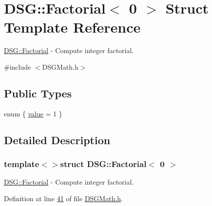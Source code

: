 \hypertarget{struct_d_s_g_1_1_factorial_3_010_01_4}{\section{D\+S\+G\+:\+:Factorial$<$ 0 $>$ Struct Template Reference}
\label{struct_d_s_g_1_1_factorial_3_010_01_4}
}


\hyperlink{struct_d_s_g_1_1_factorial}{D\+S\+G\+::\+Factorial} -\/ Compute integer factorial.  




{\ttfamily \#include $<$D\+S\+G\+Math.\+h$>$}

\subsection*{Public Types}
\begin{DoxyCompactItemize}
\item 
enum \{ \hyperlink{struct_d_s_g_1_1_factorial_3_010_01_4_a6bfe1b9c1bfc0bdeaceb03842acb1927abba93a0ae84b21f3c62dd8baa14039eb}{value} = 1
 \}
\end{DoxyCompactItemize}


\subsection{Detailed Description}
\subsubsection*{template$<$$>$struct D\+S\+G\+::\+Factorial$<$ 0 $>$}

\hyperlink{struct_d_s_g_1_1_factorial}{D\+S\+G\+::\+Factorial} -\/ Compute integer factorial. 

Definition at line \hyperlink{_d_s_g_math_8h_source_l00041}{41} of file \hyperlink{_d_s_g_math_8h_source}{D\+S\+G\+Math.\+h}.



